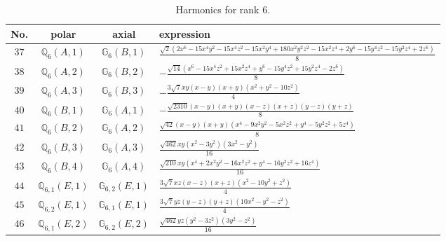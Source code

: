 \documentclass[fleqn,8pt,landscape]{jsarticle}
\begin{document}
\begin{table}[ht!]
\begin{center}
\caption{Harmonics for rank 6.}
\renewcommand{\arraystretch}{1.3}
\begin{tabular}{cccl} \hline \hline
No. & polar & axial & expression \\ \hline
$ 37 $ & $ \mathbb{Q}_{6}(A,1) $ & $ \mathbb{G}_{6}(B,1) $ & $ \frac{\sqrt{2} \left(2 x^{6} - 15 x^{4} y^{2} - 15 x^{4} z^{2} - 15 x^{2} y^{4} + 180 x^{2} y^{2} z^{2} - 15 x^{2} z^{4} + 2 y^{6} - 15 y^{4} z^{2} - 15 y^{2} z^{4} + 2 z^{6}\right)}{8} $ \\
$ 38 $ & $ \mathbb{Q}_{6}(A,2) $ & $ \mathbb{G}_{6}(B,2) $ & $ - \frac{\sqrt{14} \left(x^{6} - 15 x^{4} z^{2} + 15 x^{2} z^{4} + y^{6} - 15 y^{4} z^{2} + 15 y^{2} z^{4} - 2 z^{6}\right)}{8} $ \\
$ 39 $ & $ \mathbb{Q}_{6}(A,3) $ & $ \mathbb{G}_{6}(B,3) $ & $ - \frac{3 \sqrt{7} x y \left(x - y\right) \left(x + y\right) \left(x^{2} + y^{2} - 10 z^{2}\right)}{4} $ \\
$ 40 $ & $ \mathbb{Q}_{6}(B,1) $ & $ \mathbb{G}_{6}(A,1) $ & $ - \frac{\sqrt{2310} \left(x - y\right) \left(x + y\right) \left(x - z\right) \left(x + z\right) \left(y - z\right) \left(y + z\right)}{8} $ \\
$ 41 $ & $ \mathbb{Q}_{6}(B,2) $ & $ \mathbb{G}_{6}(A,2) $ & $ \frac{\sqrt{42} \left(x - y\right) \left(x + y\right) \left(x^{4} - 9 x^{2} y^{2} - 5 x^{2} z^{2} + y^{4} - 5 y^{2} z^{2} + 5 z^{4}\right)}{8} $ \\
$ 42 $ & $ \mathbb{Q}_{6}(B,3) $ & $ \mathbb{G}_{6}(A,3) $ & $ \frac{\sqrt{462} x y \left(x^{2} - 3 y^{2}\right) \left(3 x^{2} - y^{2}\right)}{16} $ \\
$ 43 $ & $ \mathbb{Q}_{6}(B,4) $ & $ \mathbb{G}_{6}(A,4) $ & $ \frac{\sqrt{210} x y \left(x^{4} + 2 x^{2} y^{2} - 16 x^{2} z^{2} + y^{4} - 16 y^{2} z^{2} + 16 z^{4}\right)}{16} $ \\
$ 44 $ & $ \mathbb{Q}_{6,1}(E,1) $ & $ \mathbb{G}_{6,2}(E,1) $ & $ \frac{3 \sqrt{7} x z \left(x - z\right) \left(x + z\right) \left(x^{2} - 10 y^{2} + z^{2}\right)}{4} $ \\
$ 45 $ & $ \mathbb{Q}_{6,2}(E,1) $ & $ \mathbb{G}_{6,1}(E,1) $ & $ \frac{3 \sqrt{7} y z \left(y - z\right) \left(y + z\right) \left(10 x^{2} - y^{2} - z^{2}\right)}{4} $ \\
$ 46 $ & $ \mathbb{Q}_{6,1}(E,2) $ & $ \mathbb{G}_{6,2}(E,2) $ & $ \frac{\sqrt{462} y z \left(y^{2} - 3 z^{2}\right) \left(3 y^{2} - z^{2}\right)}{16} $ \\

\end{tabular}
\end{center}
\end{table}
\end{document}
